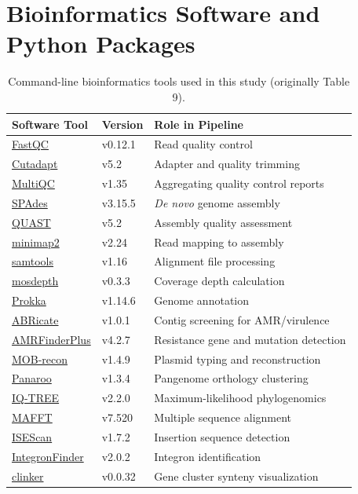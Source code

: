 \documentclass[review,11pt]{article}
\begin{document}
\clearpage
\section{Bioinformatics Software and Python Packages}

\begin{table}[h!]
\centering
\caption{Command-line bioinformatics tools used in this study (originally Table 9).}
\label{tab:bioinformatics_tools}
\footnotesize
\begin{tabular}{llp{11cm}}
\toprule
\textbf{Software Tool} & \textbf{Version} & \textbf{Role in Pipeline} \\
\midrule
\href{https://www.bioinformatics.babraham.ac.uk/projects/fastqc/}{FastQC} & v0.12.1 & Read quality control \\
\href{https://cutadapt.readthedocs.io/}{Cutadapt} & v5.2 & Adapter and quality trimming \\
\href{https://multiqc.info/}{MultiQC} & v1.35 & Aggregating quality control reports \\
\href{https://cab.spbu.ru/software/spades/}{SPAdes} & v3.15.5 & \textit{De novo} genome assembly \\
\href{https://quast.sourceforge.net/}{QUAST} & v5.2 & Assembly quality assessment \\
\href{https://github.com/lh3/minimap2}{minimap2} & v2.24 & Read mapping to assembly \\
\href{https://www.htslib.org/}{samtools} & v1.16 & Alignment file processing \\
\href{https://github.com/brentp/mosdepth}{mosdepth} & v0.3.3 & Coverage depth calculation \\
\href{https://github.com/tseemann/prokka}{Prokka} & v1.14.6 & Genome annotation \\
\href{https://github.com/tseemann/abricate}{ABRicate} & v1.0.1 & Contig screening for AMR/virulence \\
\href{https://github.com/ncbi/amr}{AMRFinderPlus} & v4.2.7 & Resistance gene and mutation detection \\
\href{https://github.com/phac-nml/mob-suite}{MOB-recon} & v1.4.9 & Plasmid typing and reconstruction \\
\href{https://gtonkinhill.github.io/panaroo/}{Panaroo} & v1.3.4 & Pangenome orthology clustering \\
\href{http://www.iqtree.org/}{IQ-TREE} & v2.2.0 & Maximum-likelihood phylogenomics \\
\href{https://mafft.cbrc.jp/alignment/software/}{MAFFT} & v7.520 & Multiple sequence alignment \\
\href{https://github.com/xiezhq/ISEScan}{ISEScan} & v1.7.2 & Insertion sequence detection \\
\href{https://integronfinder.readthedocs.io/}{IntegronFinder} & v2.0.2 & Integron identification \\
\href{https://github.com/gamcil/clinker}{clinker} & v0.0.32 & Gene cluster synteny visualization \\
\bottomrule
\end{tabular}
\end{table}
\end{document}
